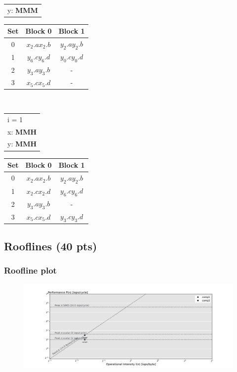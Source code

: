 \begin{enumerate}[label=\roman*. ]
\begin{table}[h!]
\begin{tabular}[t]{l}
        y: \textbf{MMM}\\
    \end{tabular}
    \begin{tabular}[t]{|c|c|c|}
    Set & Block 0 & Block 1 \\ \hline
    0 & $x_2.a$\quad$x_2.b$ & $y_2.a$\quad$y_2.b$ \\ \hline
    1 & $y_6.c$\quad$y_6.d$ & $y_0.c$\quad$y_0.d$ \\ \hline
    2 & $y_3.a$\quad$y_3.b$ & - \\ \hline
    3 & $x_5.c$\quad$x_5.d$ & - \\ \hline
    \end{tabular}
\end{table}\\
\begin{table}[h!]
    \begin{tabular}[t]{l}
        i = 1\\
        x: \textbf{MMH}\\
        y: \textbf{MMH}\\
    \end{tabular}
    \begin{tabular}[t]{|c|c|c|}
    Set & Block 0 & Block 1 \\ \hline
    0 & $x_2.a$\quad$x_2.b$ & $y_2.a$\quad$y_2.b$ \\ \hline
    1 & $x_2.c$\quad$x_2.d$ & $y_6.c$\quad$y_6.d$ \\ \hline
    2 & $y_3.a$\quad$y_3.b$ & - \\ \hline
    3 & $x_5.c$\quad$x_5.d$ & $y_3.c$\quad$y_3.d$ \\ \hline
    \end{tabular}
    \end{table}
\end{enumerate}
\subsection{Rooflines (40 pts)}
\subsubsection{Roofline plot}
\begin{figure}[h!]
    \centering
    \includegraphics[width=\linewidth]{../out/ex3a.pdf}
\end{figure}
